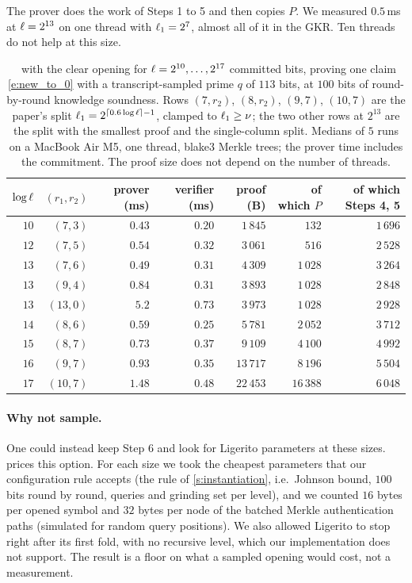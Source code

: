 \documentclass[11pt,letterpaper,usenames,dvipsnames]{article}
\begin{document}
The prover does the work of Steps 1 to 5 and then copies $P$. We measured $0.5$\,ms at $\ell=2^{13}$ on one thread with $\ell_1=2^7$, almost all of it in the GKR. Ten threads do not help at this size.

\begin{table}[h]
\centering
\small
\begin{tabular}{@{}rrrrrrr@{}}
\toprule
$\log\ell$ & $(r_1,r_2)$ & prover (ms) & verifier (ms) & proof (B) & of which $P$ & of which Steps 4, 5 \\
\midrule
$10$ & $(7,3)$ & $0.43$ & $0.20$ & $1\,845$ & $132$ & $1\,696$ \\
$12$ & $(7,5)$ & $0.54$ & $0.32$ & $3\,061$ & $516$ & $2\,528$ \\
$13$ & $(7,6)$ & $0.49$ & $0.31$ & $4\,309$ & $1\,028$ & $3\,264$ \\
$13$ & $(9,4)$ & $0.84$ & $0.31$ & $3\,893$ & $1\,028$ & $2\,848$ \\
$13$ & $(13,0)$ & $5.2$ & $0.73$ & $3\,973$ & $1\,028$ & $2\,928$ \\
$14$ & $(8,6)$ & $0.59$ & $0.25$ & $5\,781$ & $2\,052$ & $3\,712$ \\
$15$ & $(8,7)$ & $0.73$ & $0.37$ & $9\,109$ & $4\,100$ & $4\,992$ \\
$16$ & $(9,7)$ & $0.93$ & $0.35$ & $13\,717$ & $8\,196$ & $5\,504$ \\
$17$ & $(10,7)$ & $1.48$ & $0.48$ & $22\,453$ & $16\,388$ & $6\,048$ \\
\bottomrule
\end{tabular}
\caption{\ftwoz\ with the clear opening for $\ell=2^{10},\ldots,2^{17}$ committed bits, proving one claim \eqref{e:new_to_0} with a transcript-sampled prime $q$ of $113$ bits, at $100$ bits of round-by-round knowledge soundness. Rows $(7,r_2)$, $(8,r_2)$, $(9,7)$, $(10,7)$ are the paper's split $\ell_1=2^{\lceil 0.6\log\ell\rceil-1}$, clamped to $\ell_1\ge\nu$; the two other rows at $2^{13}$ are the split with the smallest proof and the single-column split. Medians of $5$ runs on a MacBook Air M5, one thread, blake3 Merkle trees; the prover time includes the commitment. The proof size does not depend on the number of threads.}
\label{tab:to_clear}
\end{table}

\paragraph{Why not sample.} One could instead keep Step 6 and look for Ligerito parameters at these sizes.  prices this option. For each size we took the cheapest parameters that our configuration rule accepts (the rule of \cref{s:instantiation}, i.e.\ Johnson bound, $100$ bits round by round, queries and grinding set per level), and we counted $16$ bytes per opened symbol and $32$ bytes per node of the batched Merkle authentication paths (simulated for random query positions). We also allowed Ligerito to stop right after its first fold, with no recursive level, which our implementation does not support. The result is a floor on what a sampled opening would cost, not a measurement.
\end{document}
